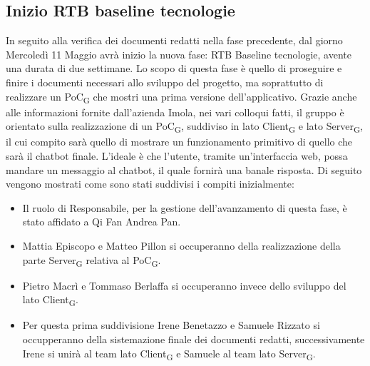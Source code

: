 \subsection{Inizio RTB baseline tecnologie}
In seguito alla verifica dei documenti redatti nella fase precedente, dal giorno Mercoledì 11 Maggio avrà inizio la nuova fase: RTB Baseline tecnologie, avente una durata di due settimane. 
Lo scopo di questa fase è quello di proseguire e finire i documenti necessari allo sviluppo del progetto, ma soprattutto di realizzare un PoC\textsubscript{G} che mostri una prima versione dell'applicativo. Grazie anche alle informazioni fornite dall'azienda Imola, nei vari colloqui fatti, il gruppo è orientato sulla realizzazione di un PoC\textsubscript{G}, suddiviso in lato Client\textsubscript{G} e lato Server\textsubscript{G}, il cui compito sarà quello di mostrare un funzionamento primitivo di quello che sarà il chatbot finale. L'ideale è che l'utente, tramite un'interfaccia web, possa mandare un messaggio al chatbot, il quale fornirà una banale risposta. 
Di seguito vengono mostrati come sono stati suddivisi i compiti inizialmente: 
\begin{itemize}
    \item Il ruolo di Responsabile, per la gestione dell'avanzamento di questa fase, è stato affidato a Qi Fan Andrea Pan.
    \item Mattia Episcopo e Matteo Pillon si occuperanno della realizzazione della parte Server\textsubscript{G} relativa al PoC\textsubscript{G}.
    \item Pietro Macrì e Tommaso Berlaffa si occuperanno invece dello sviluppo del lato Client\textsubscript{G}.
    \item Per questa prima suddivisione Irene Benetazzo e Samuele Rizzato si occupperanno della sistemazione finale dei documenti redatti, successivamente Irene si unirà al team lato Client\textsubscript{G} e Samuele al team lato Server\textsubscript{G}. 
\end{itemize}
\newpage